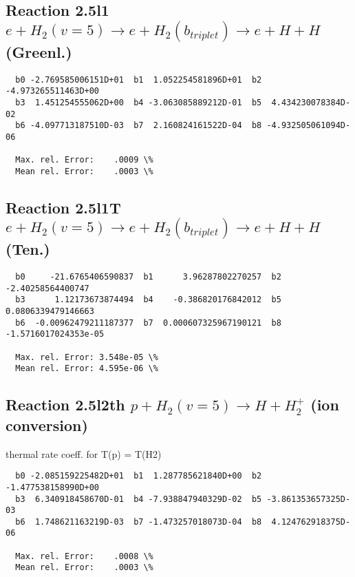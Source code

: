 \documentclass[12pt,dvipdfmx]{article}
\begin{document}
\newpage
\subsection{
Reaction 2.5l1
$ e + H_2(v=5) \rightarrow e +  H_2(b_{triplet})\rightarrow e + H + H $ (Greenl.)
}


\begin{small}\begin{verbatim}
  b0 -2.769585006151D+01  b1  1.052254581896D+01  b2 -4.973265511463D+00
  b3  1.451254555062D+00  b4 -3.063085889212D-01  b5  4.434230078384D-02
  b6 -4.097713187510D-03  b7  2.160824161522D-04  b8 -4.932505061094D-06

  Max. rel. Error:    .0009 \%
  Mean rel. Error:    .0003 \%

\end{verbatim}\end{small}



\subsection{
Reaction 2.5l1T
$  e + H_2(v=5) \rightarrow e +  H_2(b_{triplet})\rightarrow e + H + H $ (Ten.)
}

\begin{small}\begin{verbatim}
  b0     -21.6765406590837  b1      3.96287802270257  b2     -2.40258564400747
  b3      1.12173673874494  b4    -0.386820176842012  b5    0.0806339479146663
  b6  -0.00962479211187377  b7  0.000607325967190121  b8  -1.5716017024353e-05

  Max. rel. Error: 3.548e-05 \%
  Mean rel. Error: 4.595e-06 \%
\end{verbatim}\end{small}


\subsection{
Reaction 2.5l2th
$ p + H_2(v=5) \rightarrow H + H_2^+$ (ion conversion)
}
thermal rate coeff. for T(p) = T(H2)

\begin{small}\begin{verbatim}
  b0 -2.085159225482D+01  b1  1.287785621840D+00  b2 -1.477538158990D+00
  b3  6.340918458670D-01  b4 -7.938847940329D-02  b5 -3.861353657325D-03
  b6  1.748621163219D-03  b7 -1.473257018073D-04  b8  4.124762918375D-06

  Max. rel. Error:    .0008 \%
  Mean rel. Error:    .0003 \%

\end{verbatim}\end{small}
\end{document}
